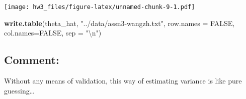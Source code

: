 \documentclass[]{article}
\newenvironment{Shaded}{\begin{snugshade}}{\end{snugshade}}
\newcommand{\KeywordTok}[1]{\textcolor[rgb]{0.13,0.29,0.53}{\textbf{#1}}}
\newcommand{\DataTypeTok}[1]{\textcolor[rgb]{0.13,0.29,0.53}{#1}}
\newcommand{\CharTok}[1]{\textcolor[rgb]{0.31,0.60,0.02}{#1}}
\newcommand{\StringTok}[1]{\textcolor[rgb]{0.31,0.60,0.02}{#1}}
\newcommand{\OtherTok}[1]{\textcolor[rgb]{0.56,0.35,0.01}{#1}}
\newcommand{\NormalTok}[1]{#1}
\begin{document}
\texttt{[image: hw3\_files/figure-latex/unnamed-chunk-9-1.pdf]}

\begin{Shaded}
\begin{Highlighting}[]
\KeywordTok{write.table}\NormalTok{(theta_hat, }\StringTok{"../data/assn3-wangzh.txt"}\NormalTok{, }\DataTypeTok{row.names =} \OtherTok{FALSE}\NormalTok{, }\DataTypeTok{col.names=}\OtherTok{FALSE}\NormalTok{, }\DataTypeTok{sep =} \StringTok{"}\CharTok{\textbackslash{}n}\StringTok{"}\NormalTok{)}
\end{Highlighting}
\end{Shaded}

\subsection{Comment:}\label{comment-2}

Without any means of validation, this way of estimating variance is like
pure guessing\ldots{}
\end{document}
